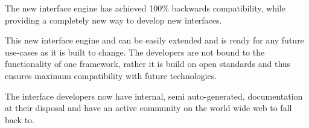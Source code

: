 \documentclass[journal,compsoc,a4paper]{IEEEtran}
\begin{document}
The new interface engine has achieved 100\% backwards compatibility, while
providing a completely new way to develop new interfaces.

This new interface engine and can be easily extended and is ready for any future
use-cases as it is built to change. The developers are not bound to the
functionality of one framework, rather it is build on open standards and thus
ensures maximum compatibility with future technologies.

The interface developers now have internal, semi auto-generated, documentation
at their disposal and have an active community on the world wide web to fall
back to.





%


%
\end{document}
